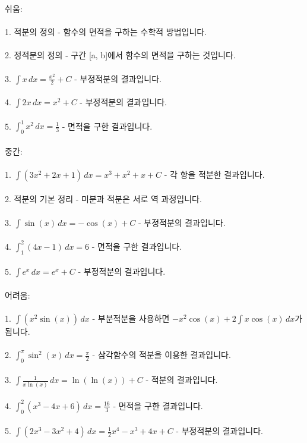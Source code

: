 \documentclass[fleqn]{article}
\begin{document}
      
        

쉬움: \\\\  
1. 적분의 정의 - 함수의 면적을 구하는 수학적 방법입니다. \\\\  
2. 정적분의 정의 - 구간 [a, b]에서 함수의 면적을 구하는 것입니다. \\\\  
3. \( \int x \, dx = \frac{x^2}{2} + C \) - 부정적분의 결과입니다. \\\\  
4. \( \int 2x \, dx = x^2 + C \) - 부정적분의 결과입니다. \\\\  
5. \( \int_0^1 x^2 \, dx = \frac{1}{3} \) - 면적을 구한 결과입니다. \\\\

중간: \\\\  
1. \( \int (3x^2 + 2x + 1) \, dx = x^3 + x^2 + x + C \) - 각 항을 적분한 결과입니다. \\\\  
2. 적분의 기본 정리 - 미분과 적분은 서로 역 과정입니다. \\\\  
3. \( \int \sin(x) \, dx = -\cos(x) + C \) - 부정적분의 결과입니다. \\\\  
4. \( \int_1^2 (4x - 1) \, dx = 6 \) - 면적을 구한 결과입니다. \\\\  
5. \( \int e^x \, dx = e^x + C \) - 부정적분의 결과입니다. \\\\

어려움: \\\\  
1. \( \int (x^2 \sin(x)) \, dx \) - 부분적분을 사용하면 \( -x^2 \cos(x) + 2 \int x \cos(x) \, dx \)가 됩니다. \\\\  
2. \( \int_0^{\pi} \sin^2(x) \, dx = \frac{\pi}{2} \) - 삼각함수의 적분을 이용한 결과입니다. \\\\  
3. \( \int \frac{1}{x \ln(x)} \, dx = \ln(\ln(x)) + C \) - 적분의 결과입니다. \\\\  
4. \( \int_0^2 (x^3 - 4x + 6) \, dx = \frac{16}{3} \) - 면적을 구한 결과입니다. \\\\  
5. \( \int (2x^3 - 3x^2 + 4) \, dx = \frac{1}{2} x^4 - x^3 + 4x + C \) - 부정적분의 결과입니다. \\\\      
        
\end{document}
